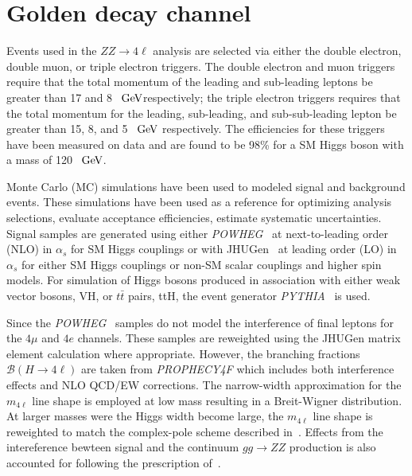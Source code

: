 \def\cm{\hbox{$\;\hbox{\rm cm}$}}
\def\eV{\hbox{$\;\hbox{\rm eV}$}}
\def\GeV{\hbox{$\;\hbox{\rm GeV}$}}
\def\MeV{\hbox{$\;\hbox{\rm MeV}$}}
\def\TeV{\hbox{$\;\hbox{\rm TeV}$}}
\def\ifb{\hbox{$fb^{-1}\rm$}}

\def\POWHEG{{\it POWHEG}}
\def\JHUGen{{\it JHUGen}}
\def\MCFM{{\it MCFM}}
\def\PYTHIA{{\it PYTHIA}}
\def\MADGRAPH{{\it MADGRAPH}}
\def\GEANTfour{{\it GEANT4}}

\newcommand{\KD}{$\mathscr{D}^{\rm kin}_{\rm bkg}$}
\newcommand{\superKD}{$\mathscr{D}_{\rm bkg}$}
\newcommand{\spinKD}{$\mathscr{D}_{J^P}$}
\newcommand{\pt}{$p_{T}$}
\newcommand{\sip}{$SIP_{3D}$}
\newcommand{\isocomb}{$ISO_{comb}$}


\section{Golden decay channel}

Events used in the $ZZ\to 4\ell$ analysis are selected via either the
double electron, double muon, or triple electron triggers.  The
double electron and muon triggers require that the total momentum
of the leading and sub-leading leptons be greater than 17 and 
8~\GeV respectively; the triple electron triggers requires that
the total momentum for the leading, sub-leading, and 
sub-sub-leading lepton be greater than 15, 8, and 5~\GeV 
respectively.  The efficiencies for these triggers have been 
measured on data and are found to be 98\% for a SM Higgs boson 
with a mass of 120~\GeV.  

Monte Carlo (MC) simulations have been used to modeled signal 
and background events.  These simulations have been used as a
reference for optimizing analysis selections, evaluate acceptance
efficiencies, estimate systematic uncertainties.  Signal samples
are generated using either \POWHEG~\cite{???} at next-to-leading 
order (NLO) in $\alpha_s$ for SM Higgs couplings or with 
JHUGen~\cite{???} at leading order (LO) in $\alpha_s$ for either
SM Higgs couplings or non-SM scalar couplings and higher spin
models.  For simulation of Higgs bosons produced in association
with either weak vector bosons, VH, or $t\bar{t}$ pairs, ttH, 
the event generator \PYTHIA~\cite{???} is used.  

Since the \POWHEG~ samples do not model the interference
of final leptons for the $4\mu$ and $4e$ channels.  These samples
are reweighted using the JHUGen matrix element calculation where
appropriate.  However, the branching fractions 
$\mathscr{B}(H\to 4\ell)$ are taken from {\it PROPHECY4F} which 
includes both interference effects and NLO QCD/EW corrections. 
The narrow-width approximation for the $m_{4\ell}$
line shape is employed at low mass resulting in a Breit-Wigner
distribution.  At larger masses were the Higgs width become large,
the $m_{4\ell}$ line shape is reweighted to match the complex-pole
scheme described in~\cite{???}.  Effects from the intereference
bewteen signal and the continuum $gg\to ZZ$ production is also 
accounted for following the prescription of~\cite{???}.

